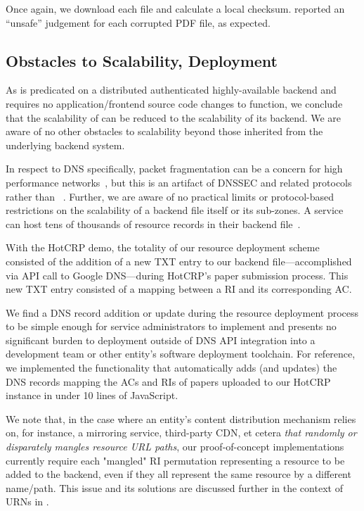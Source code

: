 Once again, we download each file and calculate a local checksum. \DHTSYS{}
reported an ``unsafe'' judgement for each corrupted PDF file, as expected.

\subsection{Obstacles to Scalability, Deployment}

As \SYSTEM{} is predicated on a distributed authenticated highly-available
backend and requires no application/frontend source code changes to function, we
conclude that the scalability of \SYSTEM{} can be reduced to the scalability of
its backend. We are aware of no other obstacles to scalability beyond those
inherited from the underlying backend system.

In respect to DNS specifically, packet fragmentation can be a concern for high
performance networks~\cite{EDNS}, but this is an artifact of DNSSEC and related
protocols rather than \SYSTEM{}~\cite{DNSSEC}. Further, we are aware of no
practical limits or protocol-based restrictions on the scalability of a backend
file itself or its sub-zones. A service can host tens of thousands of resource
records in their backend file~\cite{DNS1, DNS2}.

With the HotCRP demo, the totality of our resource deployment scheme consisted
of the addition of a new TXT entry to our backend file---accomplished via API
call to Google DNS---during HotCRP's paper submission process. This new TXT
entry consisted of a mapping between a RI and its corresponding AC.

We find a DNS record addition or update during the resource deployment process
to be simple enough for service administrators to implement and presents no
significant burden to deployment outside of DNS API integration into a
development team or other entity's software deployment toolchain. For reference,
we implemented the functionality that automatically adds (and updates) the DNS
records mapping the ACs and RIs of papers uploaded to our HotCRP instance in
under 10 lines of JavaScript.

We note that, in the case where an entity's content distribution mechanism
relies on, for instance, a mirroring service, third-party CDN, et cetera
\emph{that randomly or disparately mangles resource URL paths}, our
proof-of-concept implementations currently require each "mangled" RI permutation
representing a resource to be added to the backend, even if they all represent
the same resource by a different name/path. This issue and its solutions are
discussed further in the context of URNs in .

